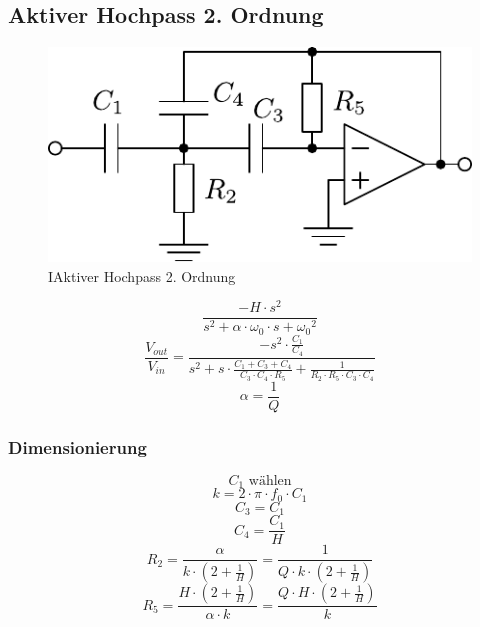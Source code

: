 



\subsection{Aktiver Hochpass 2. Ordnung}
\begin{figure}[h!]
	\centering
	\includegraphics[scale=\schscale]{op_hp_o2.pdf}
	\caption{IAktiver Hochpass 2. Ordnung}
	\label{sch:op-hp-o2}
\end{figure}
\[ \frac{-H \cdot s^2}{s^2 + \alpha \cdot \omega_0 \cdot s + {\omega_0}^2} \]
\[ \frac{V_{out}}{V_{in}} = \frac{- s^2 \cdot \frac{C_1}{C_4}}
{s^2 + s \cdot \frac{C_1 + C_3 + C_4}{C_3 \cdot C_4 \cdot R_5} 
+ \frac{1}{R_2 \cdot R_5 \cdot C_3 \cdot C_4}} \]
\[ \alpha = \frac{1}{Q} \]
\subsubsection{Dimensionierung}
\[ C_1 \text{ wählen} \]
\[ k = 2 \cdot \pi \cdot f_0 \cdot C_1 \]
\[ C_3 = C_1 \]
\[ C_4 = \frac{C_1}{H} \]
\[ R_2 = \frac{\alpha}{k \cdot \left(2 + \frac{1}{H}\right)} 
= \frac{1}{Q \cdot k \cdot \left(2 + \frac{1}{H}\right)} \]
\[ R_5 = \frac{H \cdot \left(2 + \frac{1}{H}\right)}{\alpha \cdot k} 
= \frac{Q \cdot H \cdot \left(2 + \frac{1}{H}\right)}{k} \]